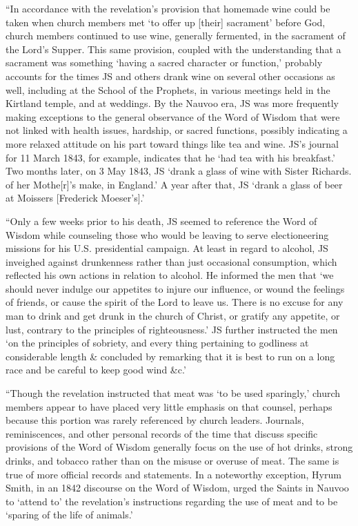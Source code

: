 			``In accordance with the revelation's provision that homemade wine could be taken when church members met `to offer up [their] sacrament' before God, church members continued to use wine, generally fermented, in the sacrament of the Lord's Supper. This same provision, coupled with the understanding that a sacrament was something `having a sacred character or function,' probably accounts for the times JS and others drank wine on several other occasions as well, including at the School of the Prophets, in various meetings held in the Kirtland temple, and at weddings. By the Nauvoo era, JS was more frequently making exceptions to the general observance of the Word of Wisdom that were not linked with health issues, hardship, or sacred functions, possibly indicating a more relaxed attitude on his part toward things like tea and wine. JS's journal for 11 March 1843, for example, indicates that he `had tea with his breakfast.' Two months later, on 3 May 1843, JS `drank a glass of wine with Sister Richards. of her Mothe[r]'s make, in England.' A year after that, JS `drank a glass of beer at Moissers [Frederick Moeser's].'

			``Only a few weeks prior to his death, JS seemed to reference the Word of Wisdom while counseling those who would be leaving to serve electioneering missions for his U.S. presidential campaign. At least in regard to alcohol, JS inveighed against drunkenness rather than just occasional consumption, which reflected his own actions in relation to alcohol. He informed the men that `we should never indulge our appetites to injure our influence, or wound the feelings of friends, or cause the spirit of the Lord to leave us. There is no excuse for any man to drink and get drunk in the church of Christ, or gratify any appetite, or lust, contrary to the principles of righteousness.' JS further instructed the men `on the principles of sobriety, and every thing pertaining to godliness at considerable length \& concluded by remarking that it is best to run on a long race and be careful to keep good wind \&c.'

			``Though the revelation instructed that meat was `to be used sparingly,' church members appear to have placed very little emphasis on that counsel, perhaps because this portion was rarely referenced by church leaders. Journals, reminiscences, and other personal records of the time that discuss specific provisions of the Word of Wisdom generally focus on the use of hot drinks, strong drinks, and tobacco rather than on the misuse or overuse of meat. The same is true of more official records and statements. In a noteworthy exception, Hyrum Smith, in an 1842 discourse on the Word of Wisdom, urged the Saints in Nauvoo to `attend to' the revelation's instructions regarding the use of meat and to be `sparing of the life of animals.'

